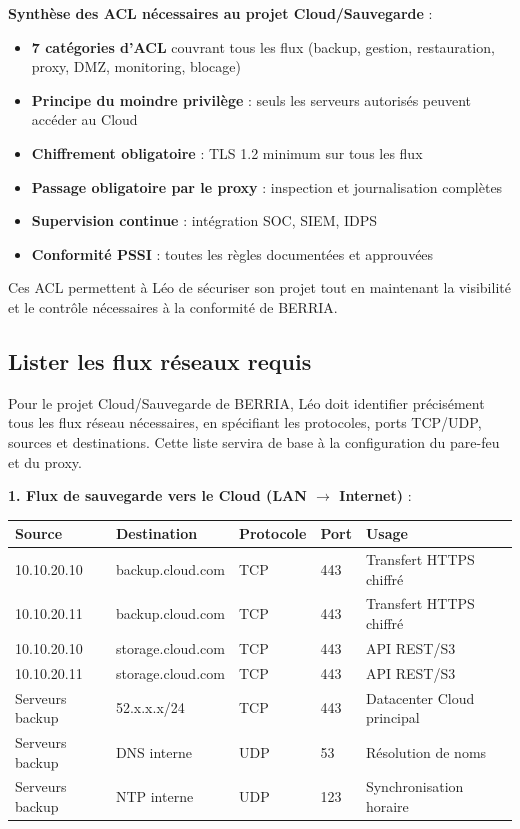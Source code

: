 \newpage

\noindent \textbf{Synthèse des ACL nécessaires au projet Cloud/Sauvegarde} :\\
\begin{itemize}
  \item \textbf{7 catégories d'ACL} couvrant tous les flux (backup, gestion, restauration, proxy, DMZ, monitoring, blocage)
  \item \textbf{Principe du moindre privilège} : seuls les serveurs autorisés peuvent accéder au Cloud
  \item \textbf{Chiffrement obligatoire} : TLS 1.2 minimum sur tous les flux
  \item \textbf{Passage obligatoire par le proxy} : inspection et journalisation complètes
  \item \textbf{Supervision continue} : intégration SOC, SIEM, IDPS
  \item \textbf{Conformité PSSI} : toutes les règles documentées et approuvées
\end{itemize}

\noindent Ces ACL permettent à Léo de sécuriser son projet tout en maintenant la visibilité et le contrôle nécessaires à la conformité de BERRIA.

\subsection*{Lister les flux réseaux requis}
{}

\noindent Pour le projet Cloud/Sauvegarde de BERRIA, Léo doit identifier précisément tous les flux réseau nécessaires, en spécifiant les protocoles, ports TCP/UDP, sources et destinations. Cette liste servira de base à la configuration du pare-feu et du proxy.

\medskip

\noindent \textbf{1. Flux de sauvegarde vers le Cloud (LAN $\rightarrow$ Internet)} :\\

{\small
\begin{tabular}{|p{}|p{}|p{}|p{}|p{}|}
\hline
\textbf{Source} & \textbf{Destination} & \textbf{Protocole} & \textbf{Port} & \textbf{Usage} \\ \hline
10.10.20.10 & backup.cloud.com & TCP & 443 & Transfert HTTPS chiffré \\ \hline
10.10.20.11 & backup.cloud.com & TCP & 443 & Transfert HTTPS chiffré \\ \hline
10.10.20.10 & storage.cloud.com & TCP & 443 & API REST/S3 \\ \hline
10.10.20.11 & storage.cloud.com & TCP & 443 & API REST/S3 \\ \hline
Serveurs backup & 52.x.x.x/24 & TCP & 443 & Datacenter Cloud principal \\ \hline
Serveurs backup & DNS interne & UDP & 53 & Résolution de noms \\ \hline
Serveurs backup & NTP interne & UDP & 123 & Synchronisation horaire \\ \hline
\end{tabular}
}

